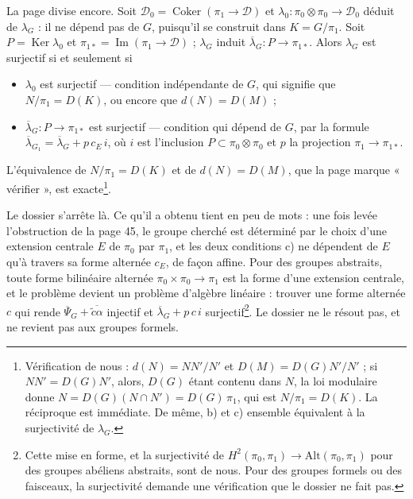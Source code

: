 \documentclass[11pt,a4paper]{article}
\begin{document}
La page divise encore. Soit $\mathcal{D}_0 = \operatorname{Coker}(\pi_1 \to
\mathcal{D})$ et $\lambda_0 \colon \pi_0 \otimes \pi_0 \to \mathcal{D}_0$
déduit de $\lambda_G$ : il ne dépend pas de $G$, puisqu'il se construit dans
$K = G/\pi_1$. Soit $P = \operatorname{Ker}\lambda_0$ et
$\pi_{1*} = \operatorname{Im}(\pi_1 \to \mathcal{D})$ ; $\lambda_G$ induit
$\overline{\lambda}_G \colon P \to \pi_{1*}$. Alors $\lambda_G$ est
surjectif si et seulement si
\begin{itemize}
  \item[b)] $\lambda_0$ est surjectif — condition indépendante de $G$, qui
  signifie que $N/\pi_1 = D(K)$, ou encore que $d(N) = D(M)$ ;
  \item[c)] $\overline{\lambda}_G \colon P \to \pi_{1*}$ est surjectif —
  condition qui dépend de $G$, par la formule
  $\overline{\lambda}_{G_1} = \overline{\lambda}_G + p\,c_E\,i$, où $i$ est
  l'inclusion $P \subset \pi_0 \otimes \pi_0$ et $p$ la projection
  $\pi_1 \to \pi_{1*}$.
\end{itemize}
L'équivalence de $N/\pi_1 = D(K)$ et de $d(N) = D(M)$, que la page marque
« vérifier », est exacte\footnote{Vérification de nous :
$d(N) = NN'/N'$ et $D(M) = D(G)N'/N'$ ; si $NN' = D(G)N'$, alors, $D(G)$ étant
contenu dans $N$, la loi modulaire donne $N = D(G)(N \cap N') =
D(G)\,\pi_1$, qui est $N/\pi_1 = D(K)$. La réciproque est immédiate. De
même, b) et c) ensemble équivalent à la surjectivité de $\lambda_G$.}.

Le dossier s'arrête là. Ce qu'il a obtenu tient en peu de mots : une fois
levée l'obstruction de la page 45, le groupe cherché est déterminé par le
choix d'une extension centrale $E$ de $\pi_0$ par $\pi_1$, et les deux
conditions c) ne dépendent de $E$ qu'à travers sa forme alternée $c_E$, de
façon affine. Pour des groupes abstraits, toute forme bilinéaire alternée
$\pi_0 \times \pi_0 \to \pi_1$ est la forme d'une extension centrale, et le
problème devient un problème d'algèbre linéaire : trouver une forme alternée
$c$ qui rende $\overline{\Psi}_G + \overline{\tilde{c}\alpha}$ injectif et
$\overline{\lambda}_G + p\,c\,i$ surjectif\footnote{Cette mise en forme,
et la surjectivité de $H^{2}(\pi_0, \pi_1) \to \mathrm{Alt}(\pi_0, \pi_1)$
pour des groupes abéliens abstraits, sont de nous. Pour des groupes formels
ou des faisceaux, la surjectivité demande une vérification que le dossier
ne fait pas.}. Le dossier ne le résout pas, et ne revient pas aux groupes
formels.
\end{document}
